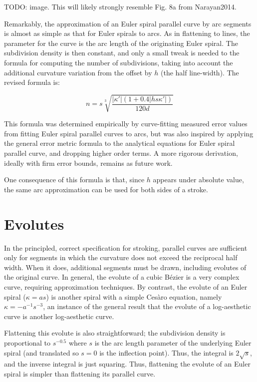 \documentclass[format=acmsmall]{acmart}
\begin{document}
TODO: image. This will likely strongly resemble Fig. 8a from Narayan2014.

Remarkably, the approximation of an Euler spiral parallel curve by arc segments is almost as simple as that for Euler spirals to arcs. As in flattening to lines, the parameter for the curve is the arc length of the originating Euler spiral. The subdivision density is then constant, and only a small tweak is needed to the formula for computing the number of subdivisions, taking into account the additional curvature variation from the offset by $h$ (the half line-width). The revised formula is:

\[
    n = s\sqrt[3]{\frac{|\kappa'|(1+0.4|hs\kappa'|)}{120d}}
\]

This formula was determined empirically by curve-fitting measured error values from fitting Euler spiral parallel curves to arcs, but was also inspired by applying the general error metric formula to the analytical equations for Euler spiral parallel curve, and dropping higher order terms. A more rigorous derivation, ideally with firm error bounds, remains as future work.

One consequence of this formula is that, since $h$ appears under absolute value, the same arc approximation can be used for both sides of a stroke.


\section{Evolutes}

In the principled, correct specification for stroking\cite{Nehab2020}, parallel curves are sufficient only for segments in which the curvature does not exceed the reciprocal half width. When it does, additional segments must be drawn, including evolutes of the original curve. In general, the evolute of a cubic Bézier is a very complex curve, requiring approximation techniques. By contrast, the evolute of an Euler spiral ($\kappa = as$) is another spiral with a simple Cesàro equation, namely $\kappa = -a^{-1}s^{-3}$, an instance of the general result that the evolute of a log-aesthetic curve is another log-aesthetic curve\cite{Yoshida2012}.

Flattening this evolute is also straightforward; the subdivision density is proportional to $s^{-0.5}$ where $s$ is the arc length parameter of the underlying Euler spiral (and translated so $s = 0$ is the inflection point). Thus, the integral is $2\sqrt{s}$, and the inverse integral is just squaring. Thus, flattening the evolute of an Euler spiral is simpler than flattening its parallel curve.
\end{document}
